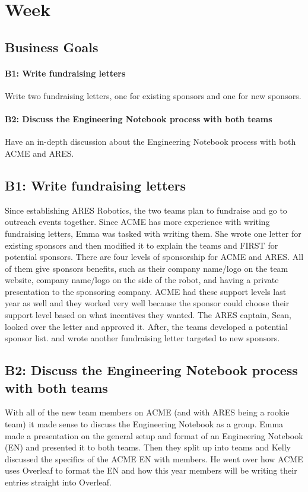 \documentclass{article}
\newif\ifcontents
\begin{document}
\tableofcontents\newpage\contentsfalse\clearpage \newpage \section{Week \thesection} 
\subsection{Business Goals}
\paragraph{B1: Write fundraising letters}
 Write two fundraising letters, one for existing sponsors and one for new sponsors. 
\paragraph{B2: Discuss the Engineering Notebook process with both teams}
 Have an in-depth discussion about the Engineering Notebook process with both ACME and ARES. 
\newpage
\subsection{B1: Write fundraising letters}

Since establishing ARES Robotics, the two teams plan to fundraise and go to outreach events together. Since ACME has more experience with writing fundraising letters, Emma was tasked with writing them. She wrote one letter for existing sponsors and then modified it to explain the teams and FIRST for potential sponsors. There are four levels of sponsorship for ACME and ARES. All of them give sponsors benefits, such as their company name/logo on the team website, company name/logo on the side of the robot, and having a private presentation to the sponsoring company. ACME had these support levels last year as well and they worked very well because the sponsor could choose their support level based on what incentives they wanted. The ARES captain, Sean, looked over the letter and approved it. After, the teams developed a potential sponsor list. and wrote another fundraising letter targeted to new sponsors.  

\subsection{B2: Discuss the Engineering Notebook process with both teams}

With all of the new team members on ACME (and with ARES being a rookie team) it made sense to discuss the Engineering Notebook as a group. Emma made a presentation on the general setup and format of an Engineering Notebook (EN) and presented it to both teams. Then they split up into teams and Kelly discussed the specifics of the ACME EN with members. He went over how ACME uses Overleaf to format the EN and how this year members will be writing their entries straight into Overleaf. \\
\end{document}
